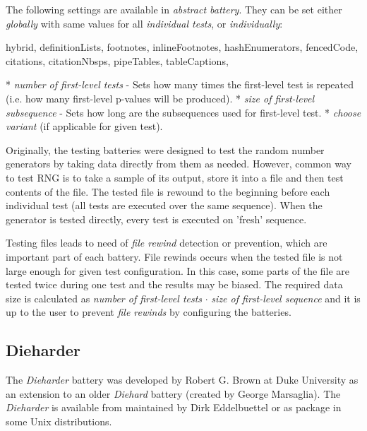 \documentclass[
  digital,     %
  oneside,     %
  nosansbold,  %
  nocolorbold, %
  nolof,         %
  nolot,         %
]{fithesis4}
\begin{document}
The following settings are available in \emph{abstract battery}. They can be set either \emph{globally} with same values for all \emph{individual tests}, or \emph{individually}:
\begin{markdown*}{%
  hybrid,
  definitionLists,
  footnotes,
  inlineFootnotes,
  hashEnumerators,
  fencedCode,
  citations,
  citationNbsps,
  pipeTables,
  tableCaptions,
}

* \emph{number of first-level tests} - Sets how many times the first-level test is repeated (i.e. how many first-level p-values will be produced).
* \emph{size of first-level subsequence} - Sets how long are the subsequences used for first-level test.
* \emph{choose variant} (if applicable for given test).


\end{markdown*}



Originally, the testing batteries were designed to test the random number generators by taking data directly from them as needed. However, common way to test RNG is to take a sample of its output, store it into a file and then test contents of the file. The tested file is rewound to the beginning before each individual test (all tests are executed over the same sequence). When the generator is tested directly, every test is executed on 'fresh' sequence. 

Testing files leads to need of \emph{file rewind} detection or prevention, which are important part of each battery. File rewinds occurs when the tested file is not large enough for given test configuration. In this case, some parts of the file are tested twice during one test and the results may be biased. The required data size is calculated as \emph{number of first-level tests} $\cdot$ \emph{size of first-level sequence} and it is up to the user to prevent \emph{file rewinds} by configuring the batteries.


\subsection{Dieharder} \label{chap:sols-dieharder}
The \emph{Dieharder} battery was developed by Robert G. Brown at Duke University\cite{dieharder_orig} as an extension to an older \emph{Diehard} battery (created by George Marsaglia). The \emph{Dieharder} is available from \cite{dieharder-git} maintained by Dirk Eddelbuettel or as package in some Unix distributions.
\end{document}
